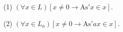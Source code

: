 (1) $(\forall x \in L)[x \neq 0 \rightarrow \text{As}' x \in x].$

(2) $(\forall x \in L_a)[x \neq 0 \rightarrow \text{As}' a x \in x].$
